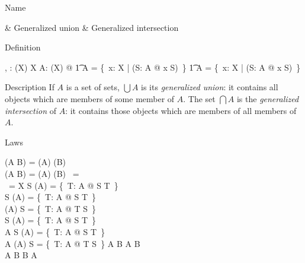 \begin{manpage}\label{p:60}
\item[Name]
\begin{name}
        \bigcup & Generalized union%
			\symdex{$\bigcup$}
\also
        \bigcap & Generalized intersection%
                \symdex{$\bigcap$}
\end{name}

\item[Definition]
\begin{gendef}[X]
        \bigcup, \bigcap: \power (\power X) \fun \power X
\where
        \forall A: \power (\power X) @
\also
\t1         \bigcup A = \{~x: X | (\exists S: A @ x \in S)~\} \land
\also
\t1         \bigcap A = \{~x: X | (\forall S: A @ x \in S)~\}
\end{gendef}

\item[Description]
If $A$ is a set of sets, $\bigcup A$ is its {\em generalized union}:
it contains all objects which are members of some member of $A$.
The set $\bigcap A$ is the {\em generalized intersection\/} of $A$:
it contains those objects which are members of all members of $A$.

\item[Laws]
\begin{laws}
        \bigcup (A \cup B) = (\bigcup A) \cup (\bigcup B) \\
        \bigcap (A \cup B) = (\bigcap A) \cap (\bigcap B)
\also
        \bigcup[X]~\empty = \empty \\
        \bigcap[X]~\empty = X
\also
        S \cap (\bigcup A) = \bigcup \{~T: A @ S \cap T~\} \\
        S \cup (\bigcap A) = \bigcap \{~T: A @ S \cup T~\} \\
        (\bigcup A) \setminus S = \bigcup \{~T: A @ T \setminus S~\} \\
        S \setminus (\bigcap A) = \bigcup \{~T: A @ S \setminus T~\} \\
        A \neq \empty \implies S \setminus (\bigcup A) = %
                \bigcap \{~T: A @ S \setminus T~\} \\
        A \neq \empty \implies (\bigcap A) \setminus S = %
                \bigcap \{~T: A @ T \setminus S~\}
\also
       A \subseteq B \implies \bigcup A \subseteq \bigcup B \\
       A \subseteq B \implies \bigcap B \subseteq \bigcap A
\end{laws}
\end{manpage}
